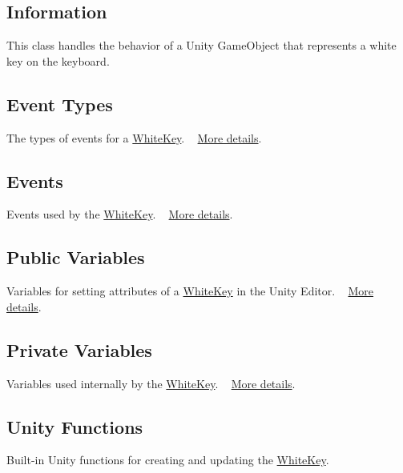 \hypertarget{group___doc_white_key_DocWhiteKeyInfo}{}\subsection{Information}\label{group___doc_white_key_DocWhiteKeyInfo}
This class handles the behavior of a Unity Game\+Object that represents a white key on the keyboard.\hypertarget{group___doc_white_key_DocWhiteKeyEventTypes}{}\subsection{Event Types}\label{group___doc_white_key_DocWhiteKeyEventTypes}
The types of events for a \hyperlink{class_white_key}{White\+Key}. ~\newline
 \hyperlink{group___white_key_event_types}{More details}.\hypertarget{group___doc_white_key_DocWhiteKeyEvents}{}\subsection{Events}\label{group___doc_white_key_DocWhiteKeyEvents}
Events used by the \hyperlink{class_white_key}{White\+Key}. ~\newline
 \hyperlink{group___white_key_events}{More details}.\hypertarget{group___doc_white_key_DocWhiteKeyPubVar}{}\subsection{Public Variables}\label{group___doc_white_key_DocWhiteKeyPubVar}
Variables for setting attributes of a \hyperlink{class_white_key}{White\+Key} in the Unity Editor. ~\newline
 \hyperlink{group___white_key_pub_var}{More details}.\hypertarget{group___doc_white_key_DocWhiteKeyPrivVar}{}\subsection{Private Variables}\label{group___doc_white_key_DocWhiteKeyPrivVar}
Variables used internally by the \hyperlink{class_white_key}{White\+Key}. ~\newline
 \hyperlink{group___white_key_priv_var}{More details}.\hypertarget{group___doc_white_key_DocWhiteKeyUnity}{}\subsection{Unity Functions}\label{group___doc_white_key_DocWhiteKeyUnity}
Built-\/in Unity functions for creating and updating the \hyperlink{class_white_key}{White\+Key}. ~\newline
